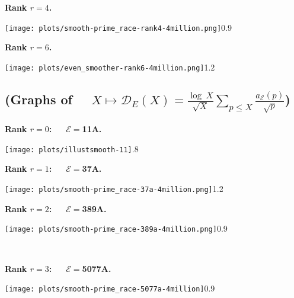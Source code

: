 \documentclass[11pt]{article}
\theoremstyle{plain}
\theoremstyle{definition}
\numberwithin{equation}{section}
\numberwithin{figure}{section}
\numberwithin{table}{section}
\begin{document}
  \vskip10pt

  \centerline{\bf Rank $r=4$.}


  \vskip20pt


    \texttt{[image: plots/smooth-prime\_race-rank4-4million.png]}{0.9}~\label{sr4}

 \vskip40pt






 \newpage

  \centerline{\bf Rank $r=6$.}


 \vskip20pt



    \texttt{[image: plots/even\_smoother-rank6-4million.png]}{1.2}~\label{sr6}
         \subsection{\bf (Graphs of \ \   $X\mapsto {\mathcal D}_E(X) = {\frac{\log\ X}{\sqrt X}}\sum_{p \le X}{\frac{a_{\mathcal E}(p)}{\sqrt p}}$)}

 \vskip40pt


  \centerline{\bf Rank $r=0$:\ \ \  ${\mathcal E}=$11A.}
   \vskip20pt
  \texttt{[image: plots/illustsmooth-11]}{.8}~\label{s11}
  \

    \newpage

  \centerline{\bf Rank $r=1$:\ \ \  ${\mathcal E}=$37A.}


   \vskip40pt



    \texttt{[image: plots/smooth-prime\_race-37a-4million.png]}{1.2}~\label{s37}
%

   \vskip40pt


  \centerline{\bf Rank $r=2$:\ \ \  ${\mathcal E}=$389A.}


  \vskip20pt


    \texttt{[image: plots/smooth-prime\_race-389a-4million.png]}{0.9}~\label{s389}


\newpage

\
  \centerline{\bf Rank $r=3$:\ \ \  ${\mathcal E}=$5077A.}


 \vskip10pt



    \texttt{[image: plots/smooth-prime\_race-5077a-4million]}{0.9}~\label{s5077}
\end{document}
